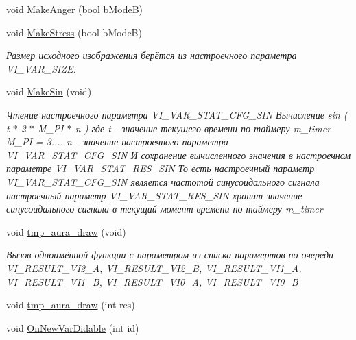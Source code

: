 \begin{DoxyCompactItemize}
void \hyperlink{class_c_v_i_engine_base_a04eac6867b0a19908706aa4181fc017e}{Make\+Anger} (bool b\+Mode\+B)
\item 
void \hyperlink{class_c_v_i_engine_base_a35022e842e74177678858dddd0d274ee}{Make\+Stress} (bool b\+Mode\+B)
\begin{DoxyCompactList}\small\item\em Размер исходного изображения берётся из настроечного параметра V\+I\+\_\+\+V\+A\+R\+\_\+\+S\+I\+Z\+E. \end{DoxyCompactList}\item 
void \hyperlink{class_c_v_i_engine_base_af5e0da5e3318399f27c259733db69be0}{Make\+Sin} (void)
\begin{DoxyCompactList}\small\item\em Чтение настроечного параметра V\+I\+\_\+\+V\+A\+R\+\_\+\+S\+T\+A\+T\+\_\+\+C\+F\+G\+\_\+\+S\+I\+N Вычисление sin ( t $\ast$ 2 $\ast$ M\+\_\+\+P\+I $\ast$ n ) где t -\/ значение текущего времени по таймеру m\+\_\+timer M\+\_\+\+P\+I = 3.... n -\/ значение настроечного параметра V\+I\+\_\+\+V\+A\+R\+\_\+\+S\+T\+A\+T\+\_\+\+C\+F\+G\+\_\+\+S\+I\+N И сохранение вычисленного значения в настроечном параметре V\+I\+\_\+\+V\+A\+R\+\_\+\+S\+T\+A\+T\+\_\+\+R\+E\+S\+\_\+\+S\+I\+N То есть настроечный параметр V\+I\+\_\+\+V\+A\+R\+\_\+\+S\+T\+A\+T\+\_\+\+C\+F\+G\+\_\+\+S\+I\+N является частотой синусоидального сигнала настроечный параметр V\+I\+\_\+\+V\+A\+R\+\_\+\+S\+T\+A\+T\+\_\+\+R\+E\+S\+\_\+\+S\+I\+N хранит значение синусоидального сигнала в текущий момент времени по таймеру m\+\_\+timer \end{DoxyCompactList}\item 
void \hyperlink{class_c_v_i_engine_base_a6b60fbe47fd49415ccbc4e55cc6e858d}{tmp\+\_\+aura\+\_\+draw} (void)
\begin{DoxyCompactList}\small\item\em Вызов одноимённой функции с параметром из списка парамертов по-\/очереди V\+I\+\_\+\+R\+E\+S\+U\+L\+T\+\_\+\+V\+I2\+\_\+\+A, V\+I\+\_\+\+R\+E\+S\+U\+L\+T\+\_\+\+V\+I2\+\_\+\+B, V\+I\+\_\+\+R\+E\+S\+U\+L\+T\+\_\+\+V\+I1\+\_\+\+A, V\+I\+\_\+\+R\+E\+S\+U\+L\+T\+\_\+\+V\+I1\+\_\+\+B, V\+I\+\_\+\+R\+E\+S\+U\+L\+T\+\_\+\+V\+I0\+\_\+\+A, V\+I\+\_\+\+R\+E\+S\+U\+L\+T\+\_\+\+V\+I0\+\_\+\+B \end{DoxyCompactList}\item 
void \hyperlink{class_c_v_i_engine_base_a9037ada333cb78e24b8178703c1bace4}{tmp\+\_\+aura\+\_\+draw} (int res)
\item 
void \hyperlink{class_c_v_i_engine_base_afb7d69a59c1067240f248d50d7172ba6}{On\+New\+Var\+Didable} (int id)

\end{DoxyCompactItemize}

